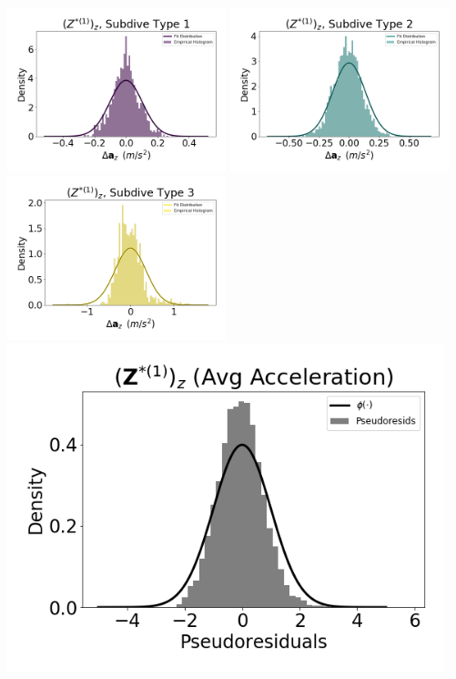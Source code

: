 \documentclass[12pt]{TD-CJS}
\begin{document}
\newpage

\includegraphics[width=2.5in]{../Plots/HHMM_empirical_hist_Az_0.png}
\includegraphics[width=2.5in]{../Plots/HHMM_empirical_hist_Az_1.png}
\includegraphics[width=2.5in]{../Plots/HHMM_empirical_hist_Az_2.png}
\includegraphics[width=5in]{../Plots/HHMM_psedoresids_Az.png}
\end{document}
